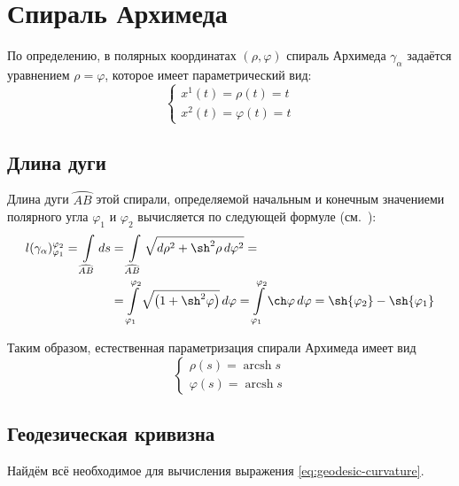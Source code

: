 \documentclass{article}
\numberwithin{equation}{section}
\renewcommand{\phi}{\varphi}
\DeclareMathOperator{\arcsh}{arcsh}
\providecommand{\arc}[1]{\wideparen{#1}}
\begin{document}
\clearpage

\section{Спираль Архимеда}

По определению, в полярных координатах $(\rho, \phi)$ спираль Архимеда
$\gamma_\alpha$ задаётся уравнением $\rho = \phi$, которое имеет
параметрический вид:
\begin{equation}\label{eq:arch-spiral}
  \begin{cases}
    x^1(t) = \rho(t) = t \\
    x^2(t) = \phi(t) = t
  \end{cases}
\end{equation}

\subsection{Длина дуги}

Длина дуги $\arc{AB}$ этой спирали, определяемой начальным и конечным значениеми
полярного угла $\phi_1$ и $\phi_2$ вычисляется по следующей формуле
(см. \cite{dubrovin98}):
\begin{equation}\label{eq:arch-length}
  \begin{split}
    l(\gamma_\alpha)^{\phi_2}_{\phi_1} =
    \int \limits_{\arc{AB}}{ds} &=
    \int \limits_{\arc{AB}}{\sqrt{d\rho^2+\sh^2\rho\,d\phi^2}} =\\
    &=\int \limits^{\phi_2}_{\phi_1}{\sqrt{\left ( 1 + \sh^2\phi \right )}}\,d\phi =
    \int \limits^{\phi_2}_{\phi_1}\ch\phi\,d\phi =
    \sh{\phi_2} - \sh{\phi_1}
  \end{split}
\end{equation}

Таким образом, естественная параметризация спирали Архимеда имеет вид
\begin{equation}\label{eq:arch-natural-param}
  \begin{cases}
    \rho(s) = \arcsh{s} \\
    \phi(s) = \arcsh{s}
  \end{cases}
\end{equation}

\subsection{Геодезическая кривизна}

Найдём всё необходимое для вычисления выражения
\eqref{eq:geodesic-curvature}.
\end{document}
